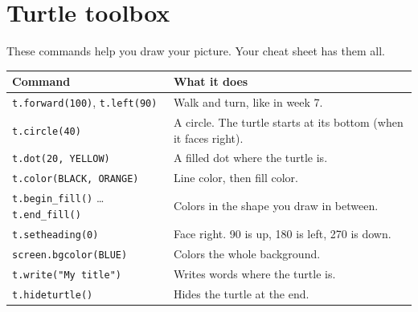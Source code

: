 \documentclass[level=1]{kidscode}
\begin{document}
\begin{center}
\end{center}

\section{Turtle toolbox}
These commands help you draw your picture. Your cheat sheet has them all.
\begin{center}\small
\renewcommand{\arraystretch}{1.3}
\begin{tabularx}{\linewidth}{@{}p{6.2cm}>{\RaggedRight\arraybackslash}X@{}}
\toprule
Command & What it does\\
\midrule
\texttt{t.forward(100)}, \texttt{t.left(90)} & Walk and turn, like in week 7.\\
\texttt{t.circle(40)} & A circle. The turtle starts at its bottom (when it faces right).\\
\texttt{t.dot(20, YELLOW)} & A filled dot where the turtle is.\\
\texttt{t.color(BLACK, ORANGE)} & Line color, then fill color.\\
\texttt{t.begin\_fill()} \ldots{} \texttt{t.end\_fill()} & Colors in the shape you draw in between.\\
\texttt{t.setheading(0)} & Face right. 90 is up, 180 is left, 270 is down.\\
\texttt{screen.bgcolor(BLUE)} & Colors the whole background.\\
\texttt{t.write("My title")} & Writes words where the turtle is.\\
\texttt{t.hideturtle()} & Hides the turtle at the end.\\
\bottomrule
\end{tabularx}
\end{center}
\end{document}
